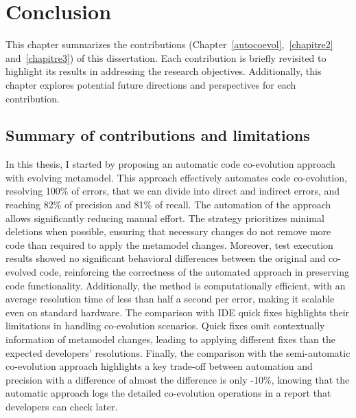 \chapter{Conclusion}
This chapter summarizes the contributions (Chapter~\ref{autocoevol},~\ref{chapitre2} and~\ref{chapitre3}) of this dissertation.%
 Each contribution is briefly revisited to highlight its results in addressing the research objectives. Additionally, this chapter explores potential future directions and perspectives for each contribution.%



\section{ Summary of contributions and limitations}
In this thesis, I started by proposing an automatic code co-evolution approach with evolving metamodel.
This approach effectively automates code co-evolution, resolving 100\% of errors, that we can divide into direct and indirect errors, and reaching 82\% of precision and 81\% of recall. The automation of the approach allows significantly reducing manual effort. The strategy prioritizes minimal deletions when possible, ensuring that necessary changes do not remove more code than required to apply the metamodel changes. Moreover, test execution results showed no significant behavioral differences between the original and co-evolved code, reinforcing the correctness of the automated approach in preserving code functionality. Additionally, the method is computationally efficient, with an average resolution time of less than half a second per error, making it scalable even on standard hardware. The comparison with IDE quick fixes highlights their limitations in handling co-evolution scenarios. Quick fixes omit contextually information of  metamodel changes, leading to applying different fixes than the expected developers' resolutions.
Finally, the comparison with the semi-automatic co-evolution approach \cite{Khelladi2020} highlights a key trade-off between automation and precision with a difference of almost the difference is only -10\%, knowing that the automatic approach logs the detailed co-evolution operations in a report that developers can check later. 

